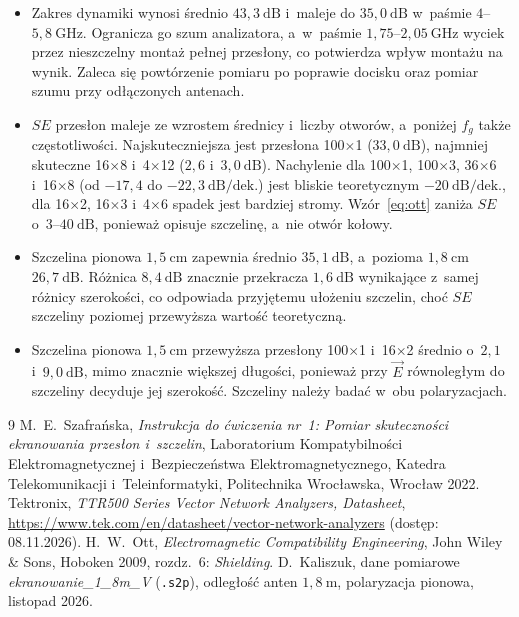 \documentclass[11pt,a4paper]{article}
\begin{document}
\begin{itemize}
  \item Zakres dynamiki wynosi średnio $43{,}3\ \mathrm{dB}$ i~maleje do $35{,}0\ \mathrm{dB}$
        w~paśmie $4$--$5{,}8\ \mathrm{GHz}$. Ogranicza go szum analizatora, a~w~paśmie
        $1{,}75$--$2{,}05\ \mathrm{GHz}$ wyciek przez nieszczelny montaż pełnej przesłony, co
        potwierdza wpływ montażu na wynik. Zaleca się powtórzenie pomiaru po poprawie docisku
        oraz pomiar szumu przy odłączonych antenach.

  \item $SE$ przesłon maleje ze wzrostem średnicy i~liczby otworów, a~poniżej $f_g$ także
        częstotliwości. Najskuteczniejsza
        jest przesłona 100$\times$1 ($33{,}0\ \mathrm{dB}$), najmniej skuteczne 16$\times$8
        i~4$\times$12 ($2{,}6$ i~$3{,}0\ \mathrm{dB}$). Nachylenie dla 100$\times$1, 100$\times$3,
        36$\times$6 i~16$\times$8 (od $-17{,}4$ do $-22{,}3\ \mathrm{dB/dek.}$) jest bliskie
        teoretycznym $-20\ \mathrm{dB/dek.}$, dla 16$\times$2, 16$\times$3 i~4$\times$6 spadek jest
        bardziej stromy. Wzór~\eqref{eq:ott} zaniża $SE$ o~$3$--$40\ \mathrm{dB}$, ponieważ
        opisuje szczelinę, a~nie otwór kołowy.

  \item Szczelina pionowa $1{,}5\ \mathrm{cm}$ zapewnia średnio $35{,}1\ \mathrm{dB}$, a~pozioma
        $1{,}8\ \mathrm{cm}$ $26{,}7\ \mathrm{dB}$. Różnica $8{,}4\ \mathrm{dB}$ znacznie przekracza
        $1{,}6\ \mathrm{dB}$ wynikające z~samej różnicy szerokości, co odpowiada przyjętemu
        ułożeniu szczelin, choć $SE$ szczeliny poziomej przewyższa wartość teoretyczną.

  \item Szczelina pionowa $1{,}5\ \mathrm{cm}$ przewyższa przesłony 100$\times$1 i~16$\times$2
        średnio o~$2{,}1$ i~$9{,}0\ \mathrm{dB}$, mimo znacznie większej długości, ponieważ przy
        $\vec E$ równoległym do szczeliny decyduje jej szerokość. Szczeliny należy badać w~obu
        polaryzacjach.
\end{itemize}

{\small
\begin{thebibliography}{9}
\setlength{\itemsep}{1pt}
 M.~E.~Szafrańska, \emph{Instrukcja do ćwiczenia nr~1: Pomiar skuteczności
  ekranowania przesłon i~szczelin}, Laboratorium Kompatybilności Elektromagnetycznej
  i~Bezpieczeństwa Elektromagnetycznego, Katedra Telekomunikacji i~Teleinformatyki,
  Politechnika Wrocławska, Wrocław 2022.
 Tektronix, \emph{TTR500 Series Vector Network Analyzers, Datasheet},
  \url{https://www.tek.com/en/datasheet/vector-network-analyzers} (dostęp: 08.11.2026).
 H.~W.~Ott, \emph{Electromagnetic Compatibility Engineering}, John Wiley \& Sons,
  Hoboken 2009, rozdz.~6: \emph{Shielding}.
 D.~Kaliszuk, dane pomiarowe \emph{ekranowanie\_1\_8m\_V} (\texttt{.s2p}),
  odległość anten $1{,}8\ \mathrm{m}$, polaryzacja pionowa, listopad 2026.
\end{thebibliography}
}
\end{document}
